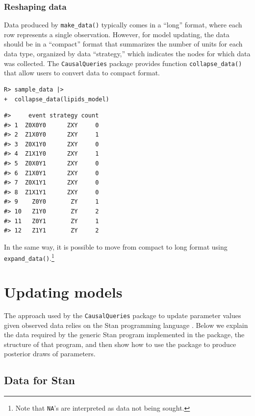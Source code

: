 \documentclass[
  11pt,
  article]{jss}
\begin{document}
\subsubsection{Reshaping data}\label{reshaping-data}

Data produced by \texttt{make\_data()} typically comes in a ``long''
format, where each row represents a single observation. However, for
model updating, the data should be in a ``compact'' format that
summarizes the number of units for each data type, organized by data
``strategy,'' which indicates the nodes for which data was collected.
The \texttt{CausalQueries} package provides function
\texttt{collapse\_data()} that allow users to convert data to compact
format.

\begin{verbatim}
R> sample_data |> 
+  collapse_data(lipids_model)
\end{verbatim}

\begin{verbatim}
#>     event strategy count
#> 1  Z0X0Y0      ZXY     0
#> 2  Z1X0Y0      ZXY     1
#> 3  Z0X1Y0      ZXY     0
#> 4  Z1X1Y0      ZXY     1
#> 5  Z0X0Y1      ZXY     0
#> 6  Z1X0Y1      ZXY     0
#> 7  Z0X1Y1      ZXY     0
#> 8  Z1X1Y1      ZXY     0
#> 9    Z0Y0       ZY     1
#> 10   Z1Y0       ZY     2
#> 11   Z0Y1       ZY     1
#> 12   Z1Y1       ZY     2
\end{verbatim}

In the same way, it is possible to move from compact to long format
using \texttt{expand\_data()}.\footnote{Note that \texttt{NA}'s are
  interpreted as data not being sought.}

\section{Updating models}\label{sec-update}

The approach used by the \texttt{CausalQueries} package to update
parameter values given observed data relies on the Stan programming
language \citep{carpenter_stan_2017}. Below we explain the data required
by the generic Stan program implemented in the package, the structure of
that program, and then show how to use the package to produce posterior
draws of parameters.

\subsection{Data for Stan}\label{data-for-stan}
\end{document}
